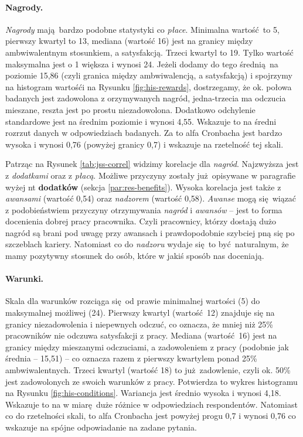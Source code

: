 \paragraph{Nagrody.} \textit{Nagrody} mają bardzo podobne statystyki co \textit{płace}. Minimalna wartość to 5, pierwszy kwartyl to 13, mediana (wartość 16) jest na granicy między ambwiwalentnym stosunkiem, a satysfakcją. Trzeci kwartyl to 19. Tylko wartość maksymalna jest o 1 większa i wynosi 24. Jeżeli dodamy do tego średnią na poziomie 15,86 (czyli granica między ambwiwalencją, a satysfakcją) i spojrzymy na histogram wartośći na Rysunku \ref{fig:his-rewards},
dostrzegamy, że ok. połowa badanych jest zadowolona z orzymywanych nagród, jedna-trzecia ma odczucia mieszane, reszta jest po prostu niezadowolona. Dodatkowo odchylenie standardowe jest na średnim poziomie i wynosi 4,55. Wskazuje to na średni rozrzut danych w odpowiedziach badanych. Za to alfa Cronbacha jest bardzo wysoka i wynosi 0,76 (powyżej granicy 0,7) i wskazuje na rzetelność tej skali.

Patrząc na Rysunek \ref{tab:jss-correl} widzimy korelacje dla \textit{nagród}. Najzwyższa jest z \textit{dodatkami} oraz z \textit{płacą}. Możliwe przyczyny zostały już opisywane w paragrafie wyżej nt \textbf{dodatków} (sekcja \ref{par:res-benefits}). Wysoka korelacja jest także z \textit{awansami} (wartość 0,54) oraz \textit{nadzorem} (wartość 0,58). \textit{Awanse} mogą się wiązać z podobieństwiem przyczyny otrzymywania \textit{nagród} i \textit{awansów} -- jest to forma
docenienia dobrej pracy pracownika. Czyli pracownicy, którzy dostają dużo nagród są brani pod uwagę przy awansach i prawdopodobnie szybciej pną się po szczeblach kariery. Natomiast co do \textit{nadzoru} wydaje się to być naturalnym, że mamy pozytywny stosunek do osób, które w jakiś sposób nas doceniają.

\paragraph{Warunki.} Skala dla warunków rozciąga się od prawie minimalnej wartości (5) do maksymalnej możliwej (24). Pierwszy kwartyl (wartość 12) znajduje się na granicy niezadowolenia i niepewnych odczuć, co oznacza, że mniej niż 25\% pracowników nie odczuwa satysfakcji z pracy. Mediana (wartość 16) jest na granicy między mieszanymi odczuciami, a zadowoleniem z pracy (podobnie jak średnia -- 15,51) -- co oznacza razem z pierwszy kwartylem ponad 25\% ambwiwalentnych. Trzeci kwartyl (wartość 18) to już zadowlenie, czyli ok. 50\% jest zadowolonych ze swoich
warunków z pracy. Potwierdza to wykres histogramu na Rysunku \ref{fig:his-conditions}. Wariancja jest średnio wysoka i wynosi 4,18. Wskazuje to na w miarę duże różnice w odpowiedziach respondentów. Natomiast co do rzetelności skali, to alfa Cronbacha jest powyżej progu 0,7 i wynosi 0,76 co wskazuje na spójne odpowiadanie na zadane pytania.

